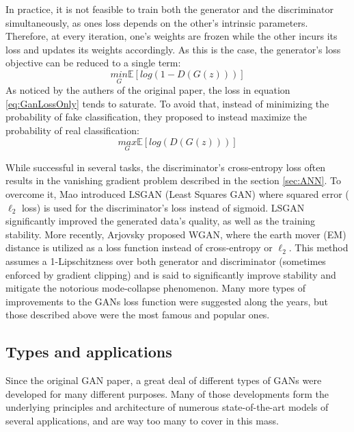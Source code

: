 In practice, it is not feasible to train both the generator and the discriminator simultaneously, as ones loss depends on the other's intrinsic parameters.
Therefore, at every iteration, one's weights are frozen while the other incurs its loss and updates its weights accordingly.
As this is the case, the generator's loss objective can be reduced to a single term:
\begin{equation}\label{eq:GanLossOnly}
    \underset{G}{min} \mathbb{E} \left[log\left(1 - D\left(G(z)\right)\right)\right]
\end{equation}
As noticed by the authers of the original paper, the loss in equation \ref{eq:GanLossOnly} tends to saturate. 
To avoid that, instead of minimizing the probability of fake classification, they proposed to instead maximize the probability of real classification:
\begin{equation}
    \underset{G}{max} \mathbb{E} \left[log\left(D\left(G(z)\right)\right)\right]
\end{equation}

While successful in several tasks, the discriminator's cross-entropy loss often results in the vanishing gradient problem described in the section \ref{sec:ANN}.
To overcome it, Mao \etal \cite{mao2017least} introduced LSGAN (Least Squares GAN) where squared error (\aka $\ell_2$ loss) is used for the discriminator's loss instead of sigmoid.
LSGAN significantly improved the generated data's quality, as well as the training stability.
More recently, Arjovsky \etal \cite{arjovsky2017wasserstein} proposed WGAN, where the earth mover (EM) distance is utilized as a loss function instead of cross-entropy or $\ell_2$.
This method assumes a 1-Lipschitzness over both generator and discriminator (sometimes enforced by gradient clipping) and is said to significantly improve stability and mitigate the notorious mode-collapse phenomenon.
Many more types of improvements to the GANs loss function were suggested along the years, but those described above were the most famous and popular ones.

\subsection{Types and applications}
Since the original GAN paper, a great deal of different types of GANs were developed for many different purposes.
Many of those developments form the underlying principles and architecture of numerous state-of-the-art models of several applications, and are way too many to cover in this mass.

